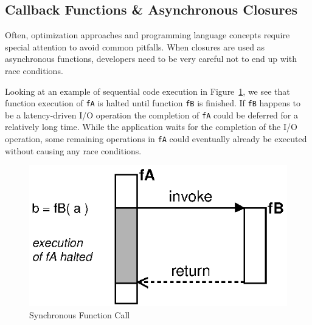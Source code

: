 


\subsection{Callback Functions \& Asynchronous Closures}

%


Often, optimization approaches and programming language concepts require special attention to avoid common pitfalls.
When closures are used as asynchronous functions, developers need to be very careful not to end up with race conditions.


Looking at an example of sequential code execution in Figure~\ref{fig:Closures_Synchronous}, we see that function execution of \texttt{fA} is halted until function \texttt{fB} is finished.
If \texttt{fB} happens to be a latency-driven I/O operation the completion of \texttt{fA} could be deferred for a relatively long time.
While the application waits for the completion of the I/O operation, some remaining operations in \texttt{fA} could eventually already be executed without causing any race conditions.
\begin{figure}[!ht]
	\centering
  \includegraphics{figures/Closures_Synchronous}
	\caption{Synchronous Function Call}
	\label{fig:Closures_Synchronous}
\end{figure}

